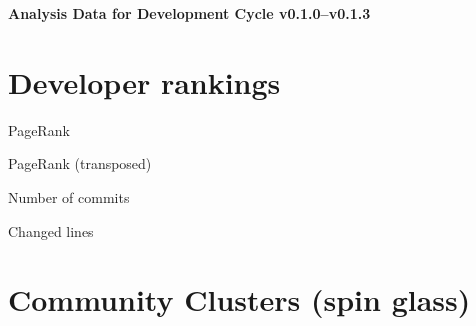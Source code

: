 \documentclass{article}
\begin{document}
\setlength{\parindent}{0pt}
\begin{center}
\begin{Large}
\textbf{Analysis Data for Development Cycle v0.1.0--v0.1.3}
\end{Large}
\end{center}
\section{Developer rankings}
\begin{small}\renewcommand{\tabcolsep}{1pt}
\begin{minipage}{0.5\linewidth}
PageRank\\

\end{minipage}%
\begin{minipage}{0.5\linewidth}
PageRank (transposed)\\

\end{minipage}

\renewcommand{\tabcolsep}{5pt}
\begin{minipage}{0.5\linewidth}
Number of commits\\

\end{minipage}%
\begin{minipage}{0.5\linewidth}
Changed lines\\

\end{minipage}
\end{small}
\newpage\section{Community Clusters (spin glass)}
\end{document}
